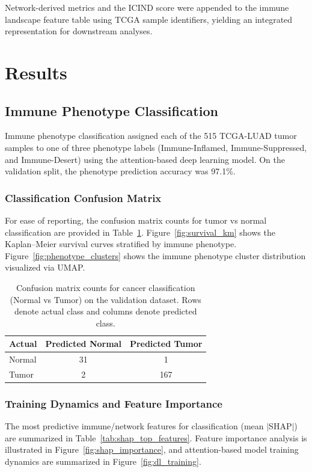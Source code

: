\documentclass[conference]{IEEEtran}
\begin{document}
Network-derived metrics and the ICIND score were appended to the immune landscape feature table using TCGA sample identifiers, yielding an integrated representation for downstream analyses.

\section{Results}
\subsection{Immune Phenotype Classification}
Immune phenotype classification assigned each of the 515 TCGA-LUAD tumor samples to one of three phenotype labels (Immune-Inflamed, Immune-Suppressed, and Immune-Desert) using the attention-based deep learning model.
On the validation split, the phenotype prediction accuracy was 97.1\%.

\subsubsection{Classification Confusion Matrix}
For ease of reporting, the confusion matrix counts for tumor vs normal classification are provided in Table~\ref{tab:confusion_matrix_counts}. Figure~\ref{fig:survival_km} shows the Kaplan--Meier survival curves stratified by immune phenotype. Figure~\ref{fig:phenotype_clusters} shows the immune phenotype cluster distribution visualized via UMAP.

\begin{table}[!t]
\centering
\caption{Confusion matrix counts for cancer classification (Normal vs Tumor) on the validation dataset. Rows denote actual class and columns denote predicted class.}
\label{tab:confusion_matrix_counts}
\begin{tabular}{lcc}
\toprule
\textbf{Actual} & \textbf{Predicted Normal} & \textbf{Predicted Tumor} \\
\midrule
Normal & 31 & 1 \\
Tumor  & 2  & 167 \\
\bottomrule
\end{tabular}
\end{table}

\subsubsection{Training Dynamics and Feature Importance}
The most predictive immune/network features for classification (mean $|$SHAP$|$) are summarized in Table~\ref{tab:shap_top_features}. Feature importance analysis is illustrated in Figure~\ref{fig:shap_importance}, and attention-based model training dynamics are summarized in Figure~\ref{fig:dl_training}.
\end{document}
